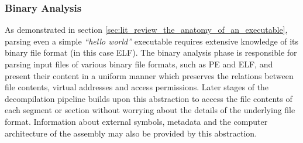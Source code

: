 
\subsubsection{Binary Analysis}
\label{sec:lit_review_binary_analysis}

As demonstrated in section \ref{sec:lit_review_the_anatomy_of_an_executable}, parsing even a simple \textit{``hello world''} executable requires extensive knowledge of its binary file format (in this case ELF). The binary analysis phase is responsible for parsing input files of various binary file formats, such as PE and ELF, and present their content in a uniform manner which preserves the relations between file contents, virtual addresses and access permissions. Later stages of the decompilation pipeline builds upon this abstraction to access the file contents of each segment or section without worrying about the details of the underlying file format. Information about external symbols, metadata and the computer architecture of the assembly may also be provided by this abstraction.
